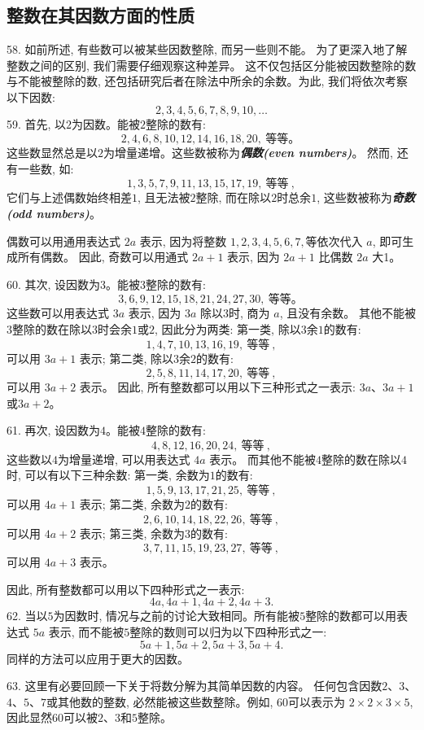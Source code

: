 \subsection{整数在其因数方面的性质}
\par
58. 如前所述, 有些数可以被某些因数整除, 而另一些则不能。
为了更深入地了解整数之间的区别, 我们需要仔细观察这种差异。
这不仅包括区分能被因数整除的数与不能被整除的数, 还包括研究后者在除法中所余的余数。为此, 我们将依次考察以下因数: 
\[
	2, 3, 4, 5, 6, 7, 8, 9, 10, \dots
\]
59. 首先, 以$2$为因数。能被$2$整除的数有: 
\[
	2, 4, 6, 8, 10, 12, 14, 16, 18, 20, \ \text{等等。}\  
\]
这些数显然总是以$2$为增量递增。这些数被称为\textbf{\textit{偶数(even numbers)}}。  
然而, 还有一些数, 如: 
\[
1, 3, 5, 7, 9, 11, 13, 15, 17, 19, \ \text{等等}\ , 
\]
它们与上述偶数始终相差$1$, 且无法被$2$整除, 而在除以$2$时总余$1$, 这些数被称为\textbf{\textit{奇数(odd numbers)}}。
\par
偶数可以用通用表达式 $2a$ 表示, 因为将整数 $1, 2, 3, 4, 5, 6, 7, $等依次代入 $a$, 即可生成所有偶数。
因此, 奇数可以用通式 $2a + 1$ 表示, 因为 $2a + 1$ 比偶数 $2a$ 大1。
\par
60. 其次, 设因数为3。能被3整除的数有: 
\[
	3, 6, 9, 12, 15, 18, 21, 24, 27, 30, \ \text{等等。}\ 
\]
这些数可以用表达式 $3a$ 表示, 因为 $3a$ 除以$3$时, 商为 $a$, 且没有余数。  
其他不能被$3$整除的数在除以$3$时会余$1$或$2$, 因此分为两类:   
第一类, 除以$3$余$1$的数有: 
\[
	1, 4, 7, 10, 13, 16, 19, \ \text{等等}\ , 
\]
可以用 $3a + 1$ 表示; 
第二类, 除以$3$余$2$的数有: 
\[
	2, 5, 8, 11, 14, 17, 20, \ \text{等等}\ , 
\]
可以用 $3a + 2$ 表示。  
因此, 所有整数都可以用以下三种形式之一表示: 
$3a$、$3a + 1$或$3a + 2$。

61. 再次, 设因数为$4$。能被$4$整除的数有: 
\[
	4, 8, 12, 16, 20, 24, \ \text{等等}\ , 
\]
这些数以$4$为增量递增, 可以用表达式 $4a$ 表示。  
而其他不能被$4$整除的数在除以$4$时, 可以有以下三种余数:   
第一类, 余数为$1$的数有: 
\[
	1, 5, 9, 13, 17, 21, 25, \ \text{等等}\ , 
\]
可以用 $4a + 1$ 表示; 
第二类, 余数为$2$的数有: 
\[
	2, 6, 10, 14, 18, 22, 26, \ \text{等等}\ , 
\]
可以用 $4a + 2$ 表示;   
第三类, 余数为$3$的数有: 
\[
	3, 7, 11, 15, 19, 23, 27, \ \text{等等}\ , 
\]
可以用 $4a + 3$ 表示。  

因此, 所有整数都可以用以下四种形式之一表示: 
\[
	4a, 4a + 1, 4a + 2, 4a + 3.
\]
62. 当以$5$为因数时, 情况与之前的讨论大致相同。所有能被$5$整除的数都可以用表达式 $5a$ 表示, 而不能被$5$整除的数则可以归为以下四种形式之一:   
\[
	5a + 1, 5a + 2, 5a + 3, 5a + 4.   
\]
同样的方法可以应用于更大的因数。

63. 这里有必要回顾一下关于将数分解为其简单因数的内容。  
任何包含因数$2$、$3$、$4$、$5$、$7$或其他数的整数, 必然能被这些数整除。例如, $60$可以表示为 $2 \times 2 \times 3 \times 5$, 因此显然$60$可以被$2$、$3$和$5$整除。

